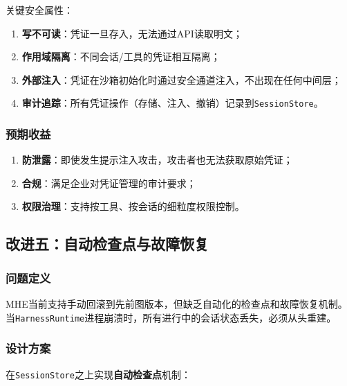 \documentclass[12pt,a4paper]{ctexart}
\begin{document}
关键安全属性：
\begin{enumerate}
    \item \textbf{写不可读}：凭证一旦存入，无法通过API读取明文；
    \item \textbf{作用域隔离}：不同会话/工具的凭证相互隔离；
    \item \textbf{外部注入}：凭证在沙箱初始化时通过安全通道注入，不出现在任何中间层；
    \item \textbf{审计追踪}：所有凭证操作（存储、注入、撤销）记录到\texttt{SessionStore}。
\end{enumerate}

\subsubsection{预期收益}

\begin{enumerate}
    \item \textbf{防泄露}：即使发生提示注入攻击，攻击者也无法获取原始凭证；
    \item \textbf{合规}：满足企业对凭证管理的审计要求；
    \item \textbf{权限治理}：支持按工具、按会话的细粒度权限控制。
\end{enumerate}

\subsection{改进五：自动检查点与故障恢复}

\subsubsection{问题定义}

MHE当前支持手动回滚到先前图版本，但缺乏自动化的检查点和故障恢复机制。当\texttt{HarnessRuntime}进程崩溃时，所有进行中的会话状态丢失，必须从头重建。

\subsubsection{设计方案}

在\texttt{SessionStore}之上实现\textbf{自动检查点}机制：
\end{document}
